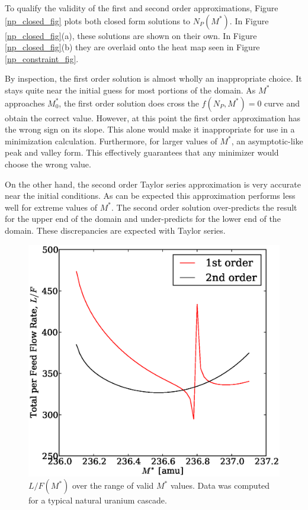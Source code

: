 \documentclass{ansconf}
\begin{document}
To qualify the validity of the first and second order approximations, 
Figure \ref{np_closed_fig} plots both closed form solutions to $N_P(M^*)$.
In Figure \ref{np_closed_fig}(a), these solutions are shown on their own.
In Figure \ref{np_closed_fig}(b) they are overlaid onto the heat map seen in 
Figure \ref{np_constraint_fig}.  

By inspection, the first order solution is almost wholly an inappropriate choice.
It stays quite near the initial guess for most portions of the domain.  As $M^*$
approaches $M_0^*$, the first order solution does cross the $f(N_P, M^*)=0$ curve 
and obtain the correct value.  However, at this point the first order approximation 
has the wrong sign on its slope.  This alone would make it inappropriate for 
use in a minimization calculation.  Furthermore, for larger values of $M^*$, an 
asymptotic-like peak and valley form.  This effectively guarantees that any minimizer
would choose the wrong value.

On the other hand, the second order Taylor series approximation is very
accurate near the initial conditions.  As can be expected this approximation performs
less well for extreme values of $M^*$.  The second order solution over-predicts the 
result for the upper end of the domain and under-predicts for the lower end of the 
domain.  These discrepancies are expected with Taylor series.

\begin{figure}[htpb]
\begin{center}
\includegraphics[scale=0.5]{loverf.eps}
\caption{$L/F(M^*)$ over the range of valid $M^*$ values.
Data was computed for a typical natural uranium cascade.}
\label{loverf_fig}
\end{center}
\end{figure}
\end{document}
